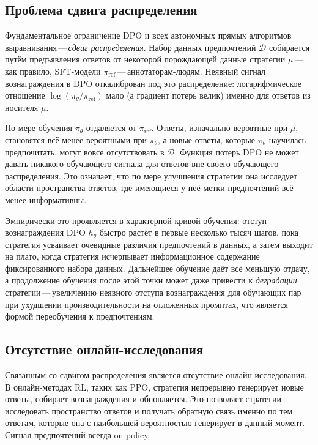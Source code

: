 \subsection{Проблема сдвига распределения}

Фундаментальное ограничение DPO и всех автономных прямых алгоритмов выравнивания\,---\,\emph{сдвиг распределения}. Набор данных предпочтений $\mathcal{D}$ собирается путём предъявления ответов от некоторой порождающей данные стратегии $\mu$\,---\,как правило, SFT-модели $\pi_\mathrm{ref}$\,---\,аннотаторам-людям. Неявный сигнал вознаграждения в DPO откалиброван под это распределение: логарифмическое отношение $\log(\pi_\theta / \pi_\mathrm{ref})$ мало (а градиент потерь велик) именно для ответов из носителя $\mu$.

По мере обучения $\pi_\theta$ отдаляется от $\pi_\mathrm{ref}$. Ответы, изначально вероятные при $\mu$, становятся всё менее вероятными при $\pi_\theta$, а новые ответы, которые $\pi_\theta$ научилась предпочитать, могут вовсе отсутствовать в $\mathcal{D}$. Функция потерь DPO не может давать никакого обучающего сигнала для ответов вне своего обучающего распределения. Это означает, что по мере улучшения стратегии она исследует области пространства ответов, где имеющиеся у неё метки предпочтений всё менее информативны.

Эмпирически это проявляется в характерной кривой обучения: отступ вознаграждения DPO $h_\theta$ быстро растёт в первые несколько тысяч шагов, пока стратегия усваивает очевидные различия предпочтений в данных, а затем выходит на плато, когда стратегия исчерпывает информационное содержание фиксированного набора данных. Дальнейшее обучение даёт всё меньшую отдачу, а продолжение обучения после этой точки может даже привести к \emph{деградации} стратегии\,---\,увеличению неявного отступа вознаграждения для обучающих пар при ухудшении производительности на отложенных промптах, что является формой переобучения к предпочтениям.

\subsection{Отсутствие онлайн-исследования}

Связанным со сдвигом распределения является отсутствие онлайн-исследования. В онлайн-методах RL, таких как PPO, стратегия непрерывно генерирует новые ответы, собирает вознаграждения и обновляется. Это позволяет стратегии исследовать пространство ответов и получать обратную связь именно по тем ответам, которые она с наибольшей вероятностью генерирует в данный момент. Сигнал предпочтений всегда on-policy.

